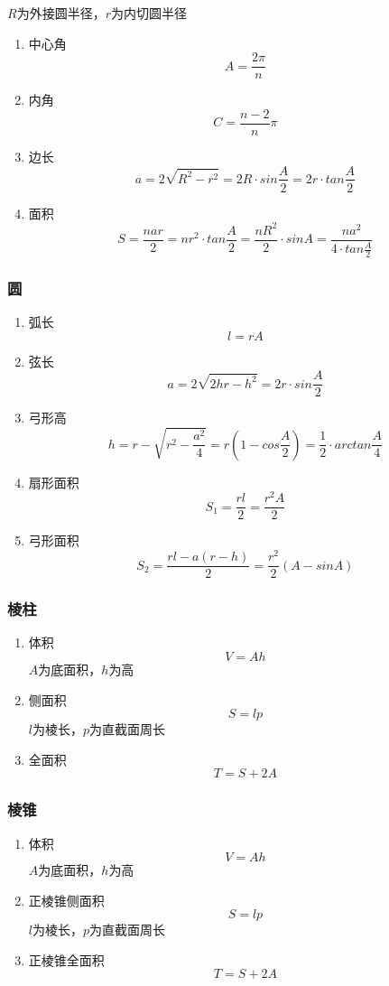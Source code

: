 \documentclass[a4paper]{article}
\begin{document}
$R$为外接圆半径，$r$为内切圆半径
\begin{enumerate}
	\item 中心角
	$$A=\frac{2\pi}{n}$$
	\item 内角
	$$C=\frac{n-2}{n}\pi$$
	\item 边长
	$$a=2\sqrt{R^2-r^2}=2R \cdot sin\frac{A}{2}=2r \cdot tan\frac{A}{2}$$
	\item 面积
	$$S=\frac{nar}{2}=nr^2 \cdot tan\frac{A}{2}=\frac{nR^2}{2} \cdot sinA=\frac{na^2}{4 \cdot tan\frac{A}{2}}$$
\end{enumerate}

\subsubsection{圆}

\begin{enumerate}
	\item 弧长
	$$l=rA$$
	\item 弦长
	$$a=2\sqrt{2hr-h^2}=2r\cdot sin\frac{A}{2}$$
	\item 弓形高
	$$h=r-\sqrt{r^2-\frac{a^2}{4}}=r(1-cos\frac{A}{2})=\frac{1}{2} \cdot arctan\frac{A}{4}$$
	\item 扇形面积
	$$S_1=\frac{rl}{2}=\frac{r^2A}{2}$$
	\item 弓形面积
	$$S_2=\frac{rl-a(r-h)}{2}=\frac{r^2}{2}(A-sinA)$$
\end{enumerate}

\subsubsection{棱柱}

\begin{enumerate}
	\item 体积
	$$V=Ah$$
	$A$为底面积，$h$为高
	\item 侧面积
	$$S=lp$$
	$l$为棱长，$p$为直截面周长
	\item 全面积
	$$T=S+2A$$
\end{enumerate}

\subsubsection{棱锥}

\begin{enumerate}
	\item 体积
	$$V=Ah$$
	$A$为底面积，$h$为高
	\item 正棱锥侧面积
	$$S=lp$$
	$l$为棱长，$p$为直截面周长
	\item 正棱锥全面积
	$$T=S+2A$$
\end{enumerate}
\end{document}
